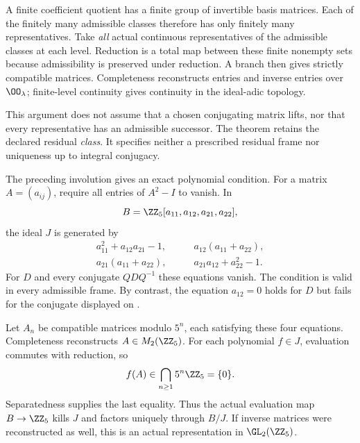 A finite coefficient quotient has a finite group of invertible basis matrices. Each of the finitely many admissible classes therefore has only finitely many representatives. Take \emph{all} actual continuous representatives of the admissible classes at each level. Reduction is a total map between these finite nonempty sets because admissibility is preserved under reduction. A branch then gives strictly compatible matrices. Completeness reconstructs entries and inverse entries over $\OO_\lambda$; finite-level continuity gives continuity in the ideal-adic topology.

This argument does not assume that a chosen conjugating matrix lifts, nor that every representative has an admissible successor. The theorem retains the declared residual \emph{class}. It specifies neither a prescribed residual frame nor uniqueness up to integral conjugacy.


The preceding involution gives an exact polynomial condition. For a matrix $A=(a_{ij})$, require all entries of $A^2-I$ to vanish. In
\[
B=\ZZ_5[a_{11},a_{12},a_{21},a_{22}],
\]
the ideal $J$ is generated by
\[
\begin{aligned}
a_{11}^2+a_{12}a_{21}-1,&\qquad a_{12}(a_{11}+a_{22}),\\
a_{21}(a_{11}+a_{22}),&\qquad a_{21}a_{12}+a_{22}^2-1.
\end{aligned}
\]
For $D$ and every conjugate $QDQ^{-1}$ these equations vanish. The condition is valid in every admissible frame. By contrast, the equation $a_{12}=0$ holds for $D$ but fails for the conjugate displayed on .

Let $A_n$ be compatible matrices modulo $5^n$, each satisfying these four equations. Completeness reconstructs $A\in M_2(\ZZ_5)$. For each polynomial $f\in J$, evaluation commutes with reduction, so
\[
f(A)\in\bigcap_{n\ge1}5^n\ZZ_5=\{0\}.
\]
Separatedness supplies the last equality. Thus the actual evaluation map $B\to\ZZ_5$ kills $J$ and factors uniquely through $B/J$. If inverse matrices were reconstructed as well, this is an actual representation in $\GL_2(\ZZ_5)$.

